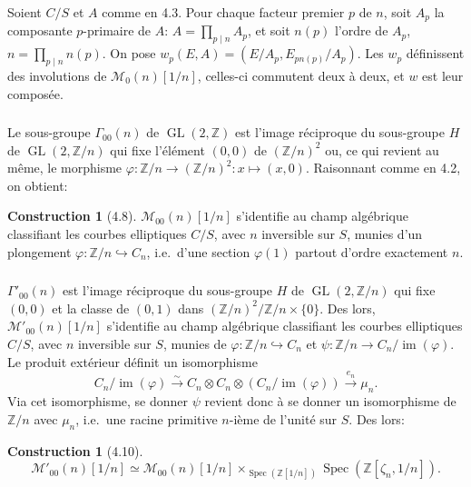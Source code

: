\documentclass[11pt,a4paper]{amsart}
\theoremstyle{plain}
\theoremstyle{definition}
\newtheorem{construction}[theorem]{Construction}
\DeclareMathOperator{\Spec}{Spec}
\DeclareMathOperator{\Gl}{GL}
\newcommand{\mll}{\mathcal{M}}
\DeclareMathOperator{\im}{im}
\newcommand{\ZZ}{\mathbb{Z}}
\begin{document}
\subsubsection{}
Soient $C/S$ et $A$ comme en 4.3. Pour chaque facteur premier $p$ de $n$, soit $A_p$ la composante $p$-primaire de $A$: $A = \prod_{p \mid n} A_p$, et soit $n(p)$ l'ordre de $A_p$, $n = \prod_{p \mid n} n(p)$. On pose $w_p(E,A) = (E/A_p, E_{pn(p)}/A_p)$. Les $w_p$ d\'efinissent des involutions de $\mll_0(n)[1/n]$, celles-ci commutent deux \`a deux, et $w$ est leur compos\'ee.

\subsubsection{}
Le sous-groupe $\Gamma_{00}(n)$ de $\Gl(2, \ZZ)$ est l'image r\'eciproque du sous-groupe $H$ de $\Gl(2, \ZZ/n)$ qui fixe l'\'el\'ement $(0,0)$ de $(\ZZ/n)^2$ ou, ce qui revient au m\^eme, le morphisme $\varphi \colon \ZZ/n \to (\ZZ/n)^2: x \mapsto (x,0)$. Raisonnant comme en 4.2, on obtient:

\begin{construction}[4.8]
$\mll_{00}(n)[1/n]$ s'identifie au champ alg\'ebrique classifiant les courbes elliptiques $C/S$, avec $n$ inversible sur $S$, munies d'un plongement $\varphi \colon \ZZ/n \hookrightarrow C_n$, i.e.\ d'une section $\varphi(1)$ partout d'ordre exactement $n$.
\end{construction}

\subsubsection{}
$\Gamma'_{00}(n)$ est l'image r\'eciproque du sous-groupe $H$ de $\Gl(2, \ZZ/n)$ qui fixe $(0,0)$ et la classe de $(0,1)$ dans $(\ZZ/n)^2/\ZZ/n \times \{0\}$. Des lors, $\mll'_{00}(n)[1/n]$ s'identifie au champ alg\'ebrique classifiant les courbes elliptiques $C/S$, avec $n$ inversible sur $S$, munies de $\varphi \colon \ZZ/n \hookrightarrow C_n$ et $\psi \colon \ZZ/n \to C_n/\im(\varphi)$. Le produit ext\'erieur d\'efinit un isomorphisme
\[
C_n/\im(\varphi) \xrightarrow{\sim} C_n \otimes C_n \otimes (C_n/\im(\varphi)) \xrightarrow{e_n} \mu_n.
\]
Via cet isomorphisme, se donner $\psi$ revient donc \`a se donner un isomorphisme de $\ZZ/n$ avec $\mu_n$, i.e.\ une racine primitive $n$-i\`eme de l'unit\'e sur $S$. Des lors:

\begin{construction}[4.10]
\[
\mll'_{00}(n)[1/n] \simeq \mll_{00}(n)[1/n] \times_{\Spec(\ZZ[1/n])} \Spec(\ZZ[\zeta_n, 1/n]).
\]
\end{construction}
\end{document}
